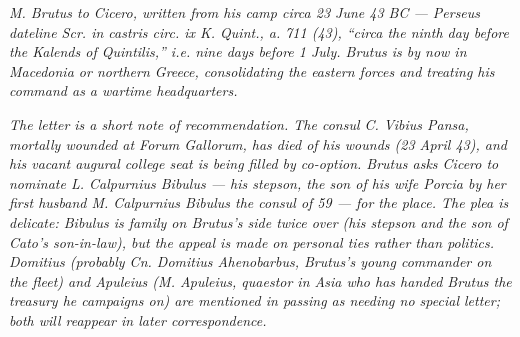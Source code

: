 
\textit{M. Brutus to Cicero, written from his camp
\textit{circa} 23 June 43 BC --- Perseus dateline
\textit{Scr. in castris circ. ix K. Quint., a. 711 (43)},
``circa the ninth day before the Kalends of Quintilis,''
i.e. nine days before 1 July. Brutus is by now in
Macedonia or northern Greece, consolidating the eastern
forces and treating his command as a wartime headquarters.}

\textit{The letter is a short note of recommendation. The
consul C. Vibius Pansa, mortally wounded at Forum Gallorum,
has died of his wounds (23 April 43), and his vacant
augural college seat is being filled by co-option. Brutus
asks Cicero to nominate L. Calpurnius Bibulus --- his
stepson, the son of his wife Porcia by her first husband
M. Calpurnius Bibulus the consul of 59 --- for the place.
The plea is delicate: Bibulus is family on Brutus's side
twice over (his stepson and the son of Cato's son-in-law),
but the appeal is made on personal ties rather than
politics. Domitius (probably Cn. Domitius Ahenobarbus,
Brutus's young commander on the fleet) and Apuleius
(M. Apuleius, quaestor in Asia who has handed Brutus the
treasury he campaigns on) are mentioned in passing as
needing no special letter; both will reappear in later
correspondence.}
